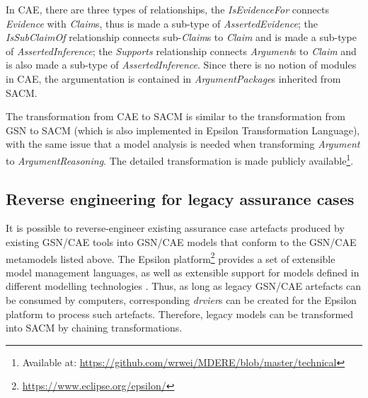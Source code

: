 In CAE, there are three types of relationships, the \textit{IsEvidenceFor} connects \textit{Evidence} with \textit{Claim}s, thus is made a sub-type of \textit{AssertedEvidence}; the \textit{IsSubClaimOf} relationship connects sub-\textit{Claim}s to \textit{Claim} and is made a sub-type of \textit{AssertedInference}; the \textit{Supports} relationship connects \textit{Argument}s to \textit{Claim} and is also made a sub-type of \textit{AssertedInference}. Since there is no notion of modules in CAE, the argumentation is contained in \textit{ArgumentPackage}s inherited from SACM.

The transformation from CAE to SACM is similar to the transformation from GSN to SACM (which is also implemented in Epsilon Transformation Language), with the same issue that a model analysis is needed when transforming \textit{Argument} to \textit{ArgumentReasoning}. The detailed transformation is made publicly available\footnote{Available at: \url{https://github.com/wrwei/MDERE/blob/master/technical}}.

\subsection{Reverse engineering for legacy assurance cases}

It is possible to reverse-engineer existing assurance case artefacts produced by existing GSN/CAE tools into GSN/CAE models that conform to the GSN/CAE metamodels listed above. The Epsilon platform\footnote{\url{https://www.eclipse.org/epsilon/}} provides a set of extensible model management languages, as well as extensible support for models defined in different modelling technologies \cite{kolovos2006eclipse}. Thus, as long as legacy GSN/CAE artefacts can be consumed by computers, corresponding \textit{drvier}s can be created for the Epsilon platform to process such artefacts. Therefore, legacy models can be transformed into SACM by chaining transformations. 

